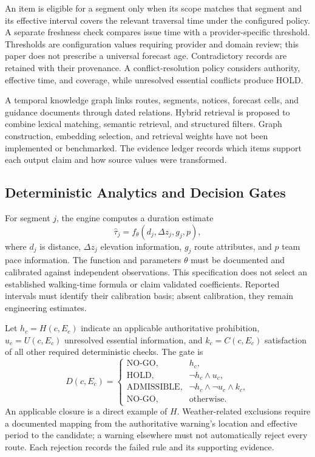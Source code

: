 \documentclass[conference]{IEEEtran}
\begin{document}
An item is eligible for a segment only when its scope matches that segment and its effective interval covers the relevant traversal time under the configured policy. A separate freshness check compares issue time with a provider-specific threshold. Thresholds are configuration values requiring provider and domain review; this paper does not prescribe a universal forecast age. Contradictory records are retained with their provenance. A conflict-resolution policy considers authority, effective time, and coverage, while unresolved essential conflicts produce HOLD.

A temporal knowledge graph links routes, segments, notices, forecast cells, and guidance documents through dated relations. Hybrid retrieval is proposed to combine lexical matching, semantic retrieval, and structured filters. Graph construction, embedding selection, and retrieval weights have not been implemented or benchmarked. The evidence ledger records which items support each output claim and how source values were transformed.

\subsection{Deterministic Analytics and Decision Gates}
For segment $j$, the engine computes a duration estimate
\begin{equation}
 \hat{\tau}_j=f_{\theta}(d_j,\Delta z_j,g_j,p),
\end{equation}
where $d_j$ is distance, $\Delta z_j$ elevation information, $g_j$ route attributes, and $p$ team pace information. The function and parameters $\theta$ must be documented and calibrated against independent observations. This specification does not select an established walking-time formula or claim validated coefficients. Reported intervals must identify their calibration basis; absent calibration, they remain engineering estimates.

Let $h_c=H(c,E_c)$ indicate an applicable authoritative prohibition, $u_c=U(c,E_c)$ unresolved essential information, and $k_c=C(c,E_c)$ satisfaction of all other required deterministic checks. The gate is
\begin{equation}
 D(c,E_c)=\begin{cases}
 \text{NO-GO},& h_c,\\
 \text{HOLD},& \neg h_c\land u_c,\\
 \text{ADMISSIBLE},&\neg h_c\land\neg u_c\land k_c,\\
 \text{NO-GO},&\text{otherwise}.
 \end{cases}
\end{equation}
An applicable closure is a direct example of $H$. Weather-related exclusions require a documented mapping from the authoritative warning's location and effective period to the candidate; a warning elsewhere must not automatically reject every route. Each rejection records the failed rule and its supporting evidence.
\end{document}
